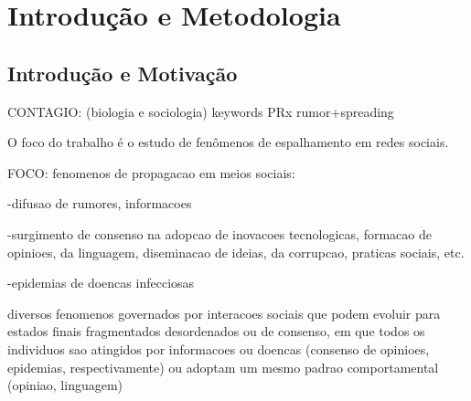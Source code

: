 \documentclass[a4paper,11pt]{report}
\newcommand{\linespacing}{1.5}
\renewcommand{\baselinestretch}{\linespacing}
\begin{document}





\newpage
{}
\tableofcontents


\newpage
{}




\chapter{Introdu\c{c}\~ao e Metodologia}
\label{chap:intro}

\section{Introdu\c{c}\~ao e Motiva\c{c}\~ao}

CONTAGIO: (biologia e sociologia)  keywords PRx rumor+spreading

O foco do trabalho \'e o estudo de fen\^omenos de espalhamento em redes sociais. 



FOCO: fenomenos de propagacao em meios sociais: 

-difusao de rumores, informacoes

-surgimento de consenso na adopcao de inovacoes tecnologicas, 
 formacao de opinioes, da linguagem, diseminacao de ideias, 
da corrupcao, praticas sociais, etc.

-epidemias de doencas infecciosas 

diversos fenomenos governados por interacoes sociais
que podem evoluir para estados finais fragmentados desordenados 
ou de consenso, em que todos os individuos sao atingidos por 
informacoes ou doencas (consenso de opinioes, epidemias, 
respectivamente) ou adoptam um mesmo padrao comportamental 
(opiniao, linguagem) \cite{BOCCALETTI:2006gb}
\end{document}
